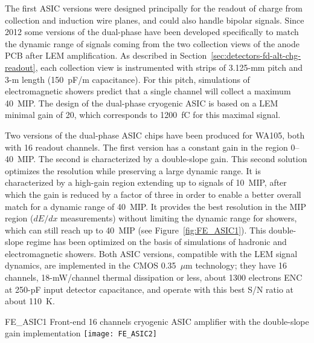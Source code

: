The first ASIC versions were designed principally for the readout of
charge from collection and induction wire planes, and could also handle
bipolar signals. Since 2012 some versions of the dual-phase
have been developed specifically to match the dynamic range of signals
coming from the two collection views of the anode PCB after LEM
amplification. As described in Section~\ref{sec:detectors-fd-alt-chg-readout},  
each collection view is instrumented
with strips of 3.125-mm pitch and 3-m length (150~pF/m capacitance).
For this pitch, simulations of electromagnetic showers predict that a single channel
will collect a maximum 40~MIP. The design of the dual-phase cryogenic ASIC
is based on a LEM minimal gain of 20, which corresponds to
1200~fC for this maximal signal.


Two versions of the dual-phase ASIC chips have been produced
for WA105, both with 16 readout channels. The first version has a
constant gain in the region 0--40~MIP. The second is
characterized by a double-slope gain. This second solution optimizes the
resolution while preserving a large dynamic range. It is characterized
by a high-gain region extending up to signals of 10~MIP, after which the
gain is reduced by a factor of three in order to enable a better overall match for a dynamic
range of 40~MIP.  It provides the best resolution in the MIP
region ($dE/dx$ measurements) without limiting the dynamic range for
showers, which can still reach up to 40~MIP (see
Figure~\ref{fig:FE_ASIC1}). This double-slope regime has been
optimized on the basis of simulations of hadronic and electromagnetic
showers. Both ASIC versions, compatible with the LEM signal dynamics,
are implemented in the CMOS 0.35~$\mu$m technology; they have 16 channels,
18-mW/channel thermal dissipation or less, about 1300 electrons ENC at
250-pF input detector capacitance, and operate with this best S/N ratio at about 110~K.
\begin{cdrfigure}{FE_ASIC1} 
{Front-end 16 channels cryogenic ASIC amplifier with the double-slope gain implementation}
\texttt{[image: FE\_ASIC2]}
\end{cdrfigure}

